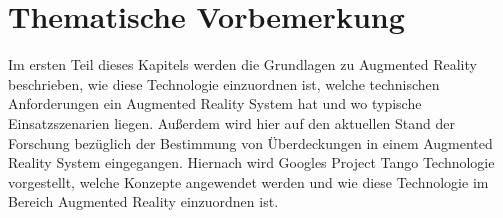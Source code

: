 \chapter{Thematische Vorbemerkung} \label{sec:thema}

Im ersten Teil dieses Kapitels werden die Grundlagen zu Augmented Reality beschrieben, wie diese Technologie einzuordnen ist, welche technischen Anforderungen ein Augmented Reality System hat und wo typische Einsatzszenarien liegen. Außerdem wird hier auf den aktuellen Stand der Forschung bezüglich der Bestimmung von Überdeckungen in einem Augmented Reality System eingegangen. Hiernach wird Googles Project Tango Technologie vorgestellt, welche Konzepte angewendet werden und wie diese Technologie im Bereich Augmented Reality einzuordnen ist. 







